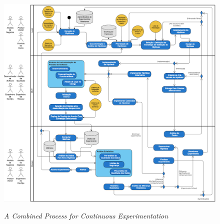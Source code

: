 \begin{figure}
\centering
\caption{\textit{A Combined Process for Continuous Experimentation}}
\includegraphics[width=1\linewidth]{figuras/combined_ce_process.png}
\label{fig:erthal-process}
\end{figure}

